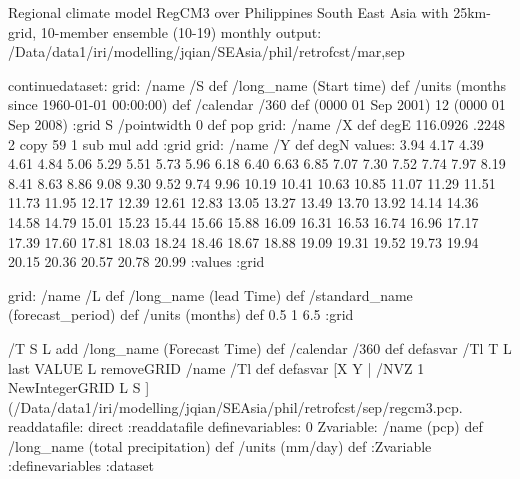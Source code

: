 Regional climate model RegCM3 over Philippines South East Asia  with 25km-grid, 10-member ensemble (10-19) monthly output:
/Data/data1/iri/modelling/jqian/SEAsia/phil/retrofcst/mar,sep

\begin{ingrid}
continuedataset:
grid:
/name /S def
/long_name (Start time) def
/units (months since  1960-01-01 00:00:00) def
/calendar /360 def
(0000 01 Sep 2001)
12
(0000 01 Sep 2008)
:grid
S /pointwidth 0 def pop
grid:
/name /X def
degE
116.0926 .2248 2 copy 59 1 sub mul add
:grid
grid:
/name /Y def
degN
values:
3.94   4.17   4.39   4.61   4.84   5.06   5.29   5.51   5.73   5.96
   6.18   6.40   6.63   6.85   7.07   7.30   7.52   7.74   7.97   8.19
   8.41   8.63   8.86   9.08   9.30   9.52   9.74   9.96  10.19  10.41
  10.63  10.85  11.07  11.29  11.51  11.73  11.95  12.17  12.39  12.61
  12.83  13.05  13.27  13.49  13.70  13.92  14.14  14.36  14.58  14.79
  15.01  15.23  15.44  15.66  15.88  16.09  16.31  16.53  16.74  16.96
  17.17  17.39  17.60  17.81  18.03  18.24  18.46  18.67  18.88  19.09
  19.31  19.52  19.73  19.94  20.15  20.36  20.57  20.78  20.99
:values
:grid

grid:
/name /L def
/long_name (lead Time) def
/standard_name (forecast_period) def
/units (months) def
0.5 1 6.5
:grid



/T{
S L add
/long_name (Forecast Time) def
/calendar /360 def
}defasvar
/Tl {
T L last VALUE  L removeGRID /name /Tl def
}defasvar
[X
    Y | /NVZ 1 NewIntegerGRID 
  L S ]  (/Data/data1/iri/modelling/jqian/SEAsia/phil/retrofcst/sep/regcm3.pcp.%
readdatafile: 
direct
:readdatafile
definevariables:
0 Zvariable: /name (pcp) def /long_name (total precipitation)  def /units (mm/day) def
:Zvariable
:definevariables
:dataset
\end{ingrid}
